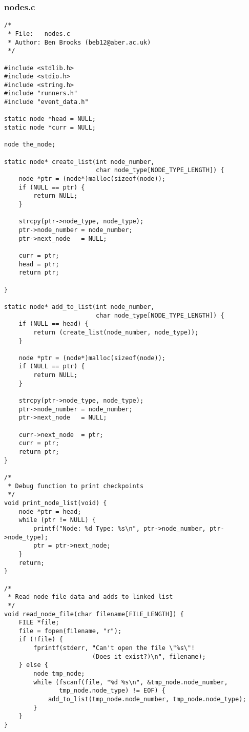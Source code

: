 \documentclass[pdftex,12pt,a4paper]{article}
\begin{document}
\subsubsection{nodes.c}
\begin{verbatim}
/*
 * File:   nodes.c
 * Author: Ben Brooks (beb12@aber.ac.uk)
 */

#include <stdlib.h>
#include <stdio.h>
#include <string.h>
#include "runners.h"
#include "event_data.h"

static node *head = NULL;
static node *curr = NULL;

node the_node;

static node* create_list(int node_number,
						 char node_type[NODE_TYPE_LENGTH]) {
    node *ptr = (node*)malloc(sizeof(node));
    if (NULL == ptr) {
        return NULL;
    }

    strcpy(ptr->node_type, node_type);
    ptr->node_number = node_number;
    ptr->next_node   = NULL;

    curr = ptr;
    head = ptr;
    return ptr;

}

static node* add_to_list(int node_number,
						 char node_type[NODE_TYPE_LENGTH]) {
    if (NULL == head) {
        return (create_list(node_number, node_type));
    }

    node *ptr = (node*)malloc(sizeof(node));
    if (NULL == ptr) {
        return NULL;
    }

    strcpy(ptr->node_type, node_type);
    ptr->node_number = node_number;
    ptr->next_node   = NULL;

    curr->next_node  = ptr;
    curr = ptr;
    return ptr;
}

/*
 * Debug function to print checkpoints
 */
void print_node_list(void) {
    node *ptr = head;
    while (ptr != NULL) {
        printf("Node: %d Type: %s\n", ptr->node_number, ptr->node_type);
        ptr = ptr->next_node;
    }
    return;
}

/*
 * Read node file data and adds to linked list
 */
void read_node_file(char filename[FILE_LENGTH]) {
    FILE *file;
    file = fopen(filename, "r");
    if (!file) {
        fprintf(stderr, "Can't open the file \"%s\"!
        				(Does it exist?)\n", filename);
    } else {
        node tmp_node;
        while (fscanf(file, "%d %s\n", &tmp_node.node_number,
        	   tmp_node.node_type) != EOF) {
            add_to_list(tmp_node.node_number, tmp_node.node_type);
        }
    }
}
\end{verbatim}
\end{document}
